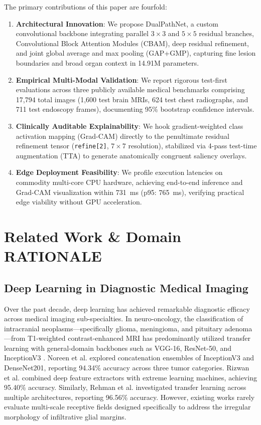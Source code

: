 \documentclass[conference]{IEEEtran}
\begin{document}
The primary contributions of this paper are fourfold:
\begin{enumerate}
    \item \textbf{Architectural Innovation}: We propose DualPathNet, a custom convolutional backbone integrating parallel $3\times 3$ and $5\times 5$ residual branches, Convolutional Block Attention Modules (CBAM), deep residual refinement, and joint global average and max pooling (GAP+GMP), capturing fine lesion boundaries and broad organ context in 14.91M parameters.
    \item \textbf{Empirical Multi-Modal Validation}: We report rigorous test-first evaluations across three publicly available medical benchmarks comprising 17,794 total images (1,600 test brain MRIs, 624 test chest radiographs, and 711 test endoscopy frames), documenting 95\% bootstrap confidence intervals.
    \item \textbf{Clinically Auditable Explainability}: We hook gradient-weighted class activation mapping (Grad-CAM) directly to the penultimate residual refinement tensor (\texttt{refine[2]}, $7\times 7$ resolution), stabilized via 4-pass test-time augmentation (TTA) to generate anatomically congruent saliency overlays.
    \item \textbf{Edge Deployment Feasibility}: We profile execution latencies on commodity multi-core CPU hardware, achieving end-to-end inference and Grad-CAM visualization within 731~ms (p95: 765~ms), verifying practical edge viability without GPU acceleration.
\end{enumerate}

\section{Related Work \& Domain RATIONALE}
\subsection{Deep Learning in Diagnostic Medical Imaging}
Over the past decade, deep learning has achieved remarkable diagnostic efficacy across medical imaging sub-specialties. In neuro-oncology, the classification of intracranial neoplasms---specifically glioma, meningioma, and pituitary adenoma---from T1-weighted contrast-enhanced MRI has predominantly utilized transfer learning with general-domain backbones such as VGG-16, ResNet-50, and InceptionV3 \cite{afshar2019capsule, ismael2020brain, noreen2020deep, rizwan2022brain, rehman2020deep}. Noreen et al. \cite{noreen2020deep} explored concatenation ensembles of InceptionV3 and DenseNet201, reporting 94.34\% accuracy across three tumor categories. Rizwan et al. \cite{rizwan2022brain} combined deep feature extractors with extreme learning machines, achieving 95.40\% accuracy. Similarly, Rehman et al. \cite{rehman2020deep} investigated transfer learning across multiple architectures, reporting 96.56\% accuracy. However, existing works rarely evaluate multi-scale receptive fields designed specifically to address the irregular morphology of infiltrative glial margins.
\end{document}
